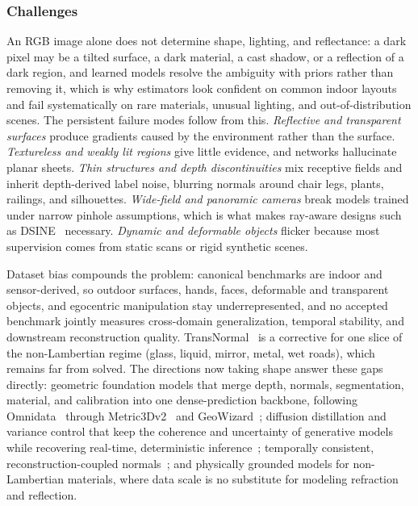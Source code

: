 \subsubsection{Challenges}

An RGB image alone does not determine shape, lighting, and reflectance: a dark pixel may be a tilted surface, a dark material, a cast shadow, or a reflection of a dark region, and learned models resolve the ambiguity with priors rather than removing it, which is why estimators look confident on common indoor layouts and fail systematically on rare materials, unusual lighting, and out-of-distribution scenes.
The persistent failure modes follow from this.
\textit{Reflective and transparent surfaces} produce gradients caused by the environment rather than the surface.
\textit{Textureless and weakly lit regions} give little evidence, and networks hallucinate planar sheets.
\textit{Thin structures and depth discontinuities} mix receptive fields and inherit depth-derived label noise, blurring normals around chair legs, plants, railings, and silhouettes.
\textit{Wide-field and panoramic cameras} break models trained under narrow pinhole assumptions, which is what makes ray-aware designs such as DSINE~\cite{bae2024dsine} necessary.
\textit{Dynamic and deformable objects} flicker because most supervision comes from static scans or rigid synthetic scenes.

Dataset bias compounds the problem: canonical benchmarks are indoor and sensor-derived, so outdoor surfaces, hands, faces, deformable and transparent objects, and egocentric manipulation stay underrepresented, and no accepted benchmark jointly measures cross-domain generalization, temporal stability, and downstream reconstruction quality. TransNormal~\cite{li2026transnormal} is a corrective for one slice of the non-Lambertian regime (glass, liquid, mirror, metal, wet roads), which remains far from solved.
The directions now taking shape answer these gaps directly: geometric foundation models that merge depth, normals, segmentation, material, and calibration into one dense-prediction backbone, following Omnidata~\cite{eftekhar2021omnidata} through Metric3Dv2~\cite{hu2024metric3dv2} and GeoWizard~\cite{fu2024geowizard}; diffusion distillation and variance control that keep the coherence and uncertainty of generative models while recovering real-time, deterministic inference~\cite{ye2024stablenormal}; temporally consistent, reconstruction-coupled normals~\cite{wang2025normalcrafter}; and physically grounded models for non-Lambertian materials, where data scale is no substitute for modeling refraction and reflection.
